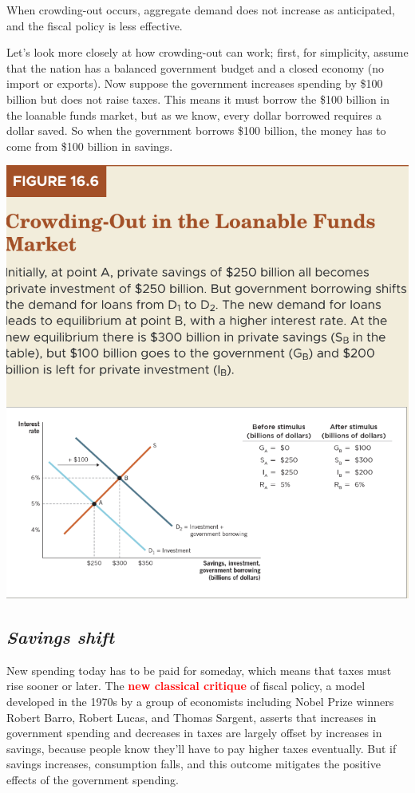 \documentclass[11pt]{article} %
\begin{document}
When crowding-out occurs, aggregate demand does not increase as anticipated, and the fiscal policy is less effective.

Let's look more closely at how crowding-out can work; first, for simplicity, assume that the nation has a balanced government budget and a closed economy (no import or exports). Now suppose the government increases spending by \$100 billion but does not raise taxes. This means it must borrow the \$100 billion in the loanable funds market, but as we know, every dollar borrowed requires a dollar saved. So when the government borrows \$100 billion, the money has to come from \$100 billion in savings.

\begin{center}
\includegraphics[scale=1]{images/Figure 16.6.png} 
\end{center}

\subsection*{\textit{\textbf{Savings shift}}}
New spending today has to be paid for someday, which means that taxes must rise sooner or later. The \textbf{\textcolor{red}{new classical critique}} of fiscal policy, a model developed in the 1970s by a group of economists including Nobel Prize winners Robert Barro, Robert Lucas, and Thomas Sargent, asserts that increases in government spending and decreases in taxes are largely offset by increases in savings, because people know they'll have to pay higher taxes eventually. But if savings increases, consumption falls, and this outcome mitigates the positive effects of the government spending.
\end{document}
